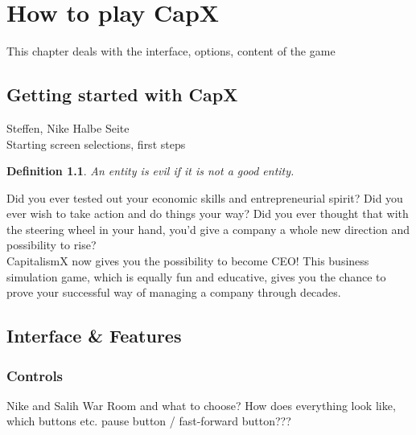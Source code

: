 \documentclass[11pt,titlepage,oneside,openany]{book}
\newtheorem{definition}{Definition}
\begin{document}
\chapter{How to play CapX}
\label{cha:theory}
 This chapter deals with the interface, options, content of the game

\section{Getting started with CapX}
Steffen, Nike
Halbe Seite\\

\label{sec:prelim}
Starting screen selections, first steps
\begin{definition}
\label{def:evil}
An entity is evil if it is not a good entity.
\end{definition}

Did you ever tested out your economic skills and entrepreneurial spirit? Did you ever wish to take action and do things your way? Did you ever thought that with the steering wheel in your hand, you'd give a company a whole new direction and possibility to rise? \\
CapitalismX now gives you the possibility to become CEO! This business simulation game, which is equally fun and educative, gives you the chance to prove your successful way of managing a company through decades.\\


\section{Interface \& Features}
\label{sec:good}

\subsection{Controls}  
Nike and Salih
War Room and what to choose? How does everything look like, which buttons etc. pause button / fast-forward button???\\

 
 
%


\end{document}
